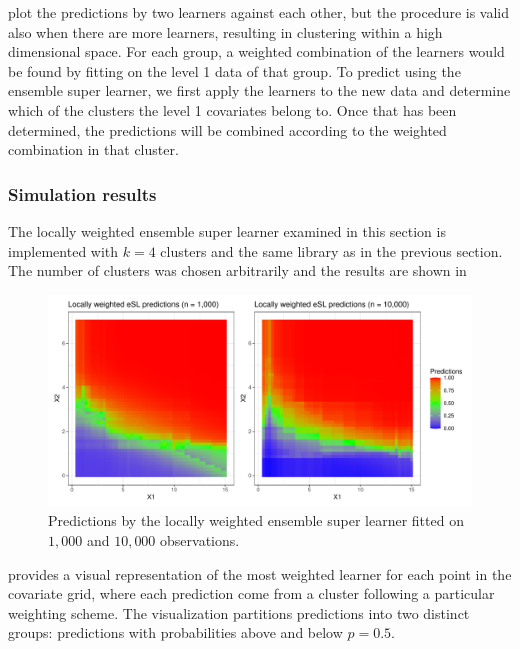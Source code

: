 \documentclass[./main.tex]{subfiles}
\begin{document}
 plot the predictions by two learners against each other, but the procedure is valid also when there are more learners, resulting in clustering within a high dimensional space. For each group, a weighted combination of the learners would be found by fitting on the level 1 data of that group. To predict using the ensemble super learner, we first apply the learners to the new data and determine which of the clusters the level 1 covariates belong to. Once that has been determined, the predictions will be combined according to the weighted combination in that cluster. 

\subsubsection{Simulation results}
The locally weighted ensemble super learner examined in this section is implemented with $ k = 4 $ clusters and the same library as in the previous section. The number of clusters was chosen arbitrarily and the results are shown in 
\begin{figure}[H]
    \centering
    \includegraphics[width=\textwidth]{figures/esl_preds_lw.pdf}
    \caption{Predictions by the locally weighted ensemble super learner fitted on $ 1,000 $ and $ 10,000 $ observations.}
    \label{fig:esl_preds_lw}
\end{figure}
 provides a visual representation of the most weighted learner for each point in the covariate grid, where each prediction come from a cluster following a particular weighting scheme. The visualization partitions predictions into two distinct groups: predictions with probabilities above and below $p = 0.5$.
\end{document}
